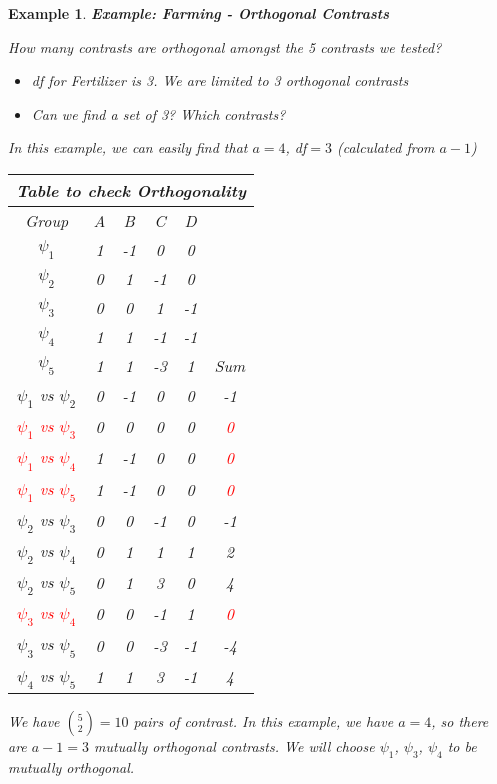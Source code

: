 \documentclass[a4paper,11pt]{article}
\newtheorem{eg}[thm]{Example}
\begin{document}
\begin{eg}
\normalfont
\textbf{Example: Farming - Orthogonal Contrasts}

How many contrasts are orthogonal amongst the 5 contrasts we tested? 
\begin{itemize}
\item df for Fertilizer is 3. We are limited to 3 orthogonal contrasts
\item Can we find a set of 3? Which contrasts? 
\end{itemize}

In this example, we can easily find that $a=4$, df$=3$ (calculated from $a-1$)
\newpage

\begin{table}[h!]
\centering
\begin{tabular}{|c|c c c c|c|} 
\hline
\multicolumn{6}{|c|}{\textbf{Table to check Orthogonality}} \\
 \hline
 Group & A & B & C & D & \\ [0.5ex] 
 \hline
 $\psi_1$ & 1 & -1 & 0 & 0 &  \\ 
 $\psi_2$ & 0 & 1 & -1 & 0 &  \\
 $\psi_3$ & 0 & 0 & 1 & -1 &  \\
 $\psi_4$ & 1 & 1 & -1 & -1 &  \\
 $\psi_5$ & 1 & 1 & -3 & 1 & Sum \\ 
 \hline
 $\psi_1$ vs $\psi_2$ & 0 & -1 & 0 & 0 & -1 \\
  \textcolor{red}{$\psi_1$ vs $\psi_3$} & 0 & 0 & 0 & 0 &  \textcolor{red}{0} \\
  \textcolor{red}{$\psi_1$ vs $\psi_4$} & 1 & -1 & 0 & 0 &  \textcolor{red}{0} \\
 \textcolor{red}{$\psi_1$ vs $\psi_5$} & 1 & -1 & 0 & 0 &  \textcolor{red}{0} \\
 $\psi_2$ vs $\psi_3$ & 0 & 0 & -1 & 0 & -1 \\
 $\psi_2$ vs $\psi_4$ & 0 & 1 & 1 & 1 & 2 \\
 $\psi_2$ vs $\psi_5$ & 0 & 1 & 3 & 0 & 4 \\
 \textcolor{red}{$\psi_3$ vs $\psi_4$} & 0 & 0 & -1 & 1 & \textcolor{red}{0} \\
 $\psi_3$ vs $\psi_5$ & 0 & 0 & -3 & -1 & -4 \\
 $\psi_4$ vs $\psi_5$ & 1 & 1 & 3 & -1 & 4 \\
 \hline
\end{tabular}
\label{table:1}
\end{table}

We have ${5\choose 2}=10$ pairs of contrast. In this example, we have $a=4$, so there are $a-1=3$ mutually orthogonal contrasts. We will choose $\psi_1$, $\psi_3$, $\psi_4$ to be mutually orthogonal. 
\end{eg}
\end{document}
